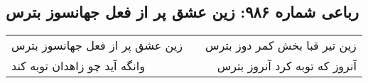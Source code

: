 \begin{center}
\section*{رباعی شماره ۹۸۶: زین عشق پر از فعل جهانسوز بترس}
\label{sec:0986}
\begin{longtable}{l p{0.5cm} r}
زین عشق پر از فعل جهانسوز بترس
&&
زین تیر قبا بخش کمر دوز بترس
\\
وانگه آید چو زاهدان توبه کند
&&
آنروز که توبه کرد آنروز بترس
\\
\end{longtable}
\end{center}
